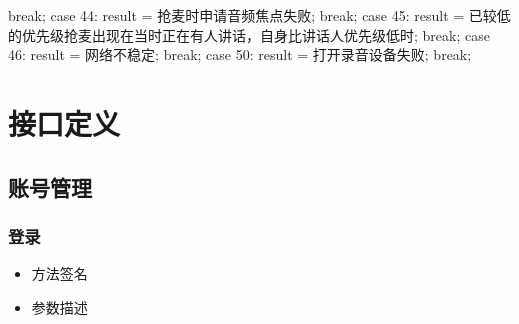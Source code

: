 \documentclass[letterpaper,10pt,english]{sphinxmanual}
\begin{document}
\begin{sphinxVerbatim}[commandchars=\\\{\}]
                    break;
                case \PYGZhy{}44:
                    result = \PYGZdq{}抢麦时申请音频焦点失败\PYGZdq{};
                    break;
                case \PYGZhy{}45:
                    result = \PYGZdq{}已较低的优先级抢麦\PYGZlt{}出现在当时正在有人讲话，自身比讲话人优先级低时\PYGZgt{}\PYGZdq{};
                    break;
                   case \PYGZhy{}46:
                    result = \PYGZdq{}网络不稳定\PYGZdq{};
                    break;
                case \PYGZhy{}50:
                    result = \PYGZdq{}打开录音设备失败\PYGZdq{};
                    break;
            \PYGZcb{}
        \PYGZcb{}
\end{sphinxVerbatim}


\section{接口定义}
\label{\detokenize{csharp:id10}}

\subsection{账号管理}
\label{\detokenize{csharp:id11}}

\subsubsection{登录}
\label{\detokenize{csharp:id12}}\begin{itemize}
\item {} 
方法签名

\end{itemize}

%
\begin{sphinxVerbatim}[commandchars=\\\{\}]
       
\end{sphinxVerbatim}
\begin{itemize}
\item {} 
参数描述

\end{itemize}
\end{document}
